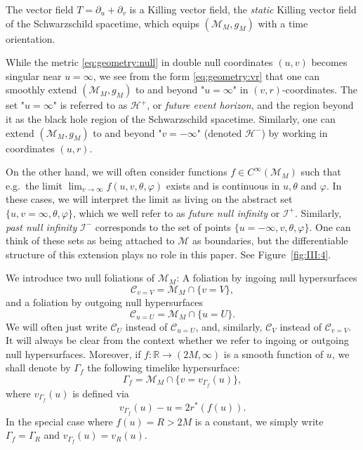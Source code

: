 \documentclass[11pt,english]{article}
\numberwithin{equation}{section}
\theoremstyle{remark}
\theoremstyle{plain}
\theoremstyle{remark}
\newcommand{\pu}{\partial_u}
\newcommand{\pv}{\partial_v}
\renewcommand{\(}{\left(}
\renewcommand{\)}{\right)}
\begin{document}
The vector field $T=\pu+\pv$ is a Killing vector field, the \textit{static} Killing vector field of the Schwarzschild spacetime, which equips $(\mathcal{M}_M,g_M)$ with a time orientation.

While the metric \eqref{eq:geometry:null} in double null coordinates $(u,v)$ becomes singular near $u=\infty$, we see from the form \eqref{eq:geometry:vr} that one can smoothly extend $(\mathcal M_M,g_M)$ to and beyond "$u=\infty$" in $(v,r)$-coordinates. The set "$u=\infty$" is referred to as $\mathcal H^+$, or \textit{future event horizon}, and the region beyond it as the black hole region of the Schwarzschild spacetime. Similarly, one can extend $(\mathcal M_M,g_M)$ to and beyond "$v=-\infty$" (denoted $\mathcal H^-$) by working in coordinates $(u,r)$.

On the other hand, we will often consider functions $f\in C^{\infty}(\mathcal M_M)$ such that  e.g.\ the limit $\lim_{v\to\infty}f(u,v,\theta,\varphi)$ exists and is continuous in $u,\theta$ and $\varphi$.
 In these cases, we will interpret the limit as living on the abstract set $\{u,v=\infty,\theta,\varphi \}$, which we well refer to as \textit{future null infinity} or $\mathcal I^+$.
 Similarly, \textit{past null infinity} $\mathcal I^-$ corresponds to the set of points $\{u=-\infty,v,\theta,\varphi\}$. 
 One can think of these sets as being attached to $\mathcal M$ as boundaries, but the differentiable structure of this extension plays no role in this paper.
 See Figure~\ref{fig:III:4}.
 

We introduce two null foliations of $\mathcal{M}_M$: A foliation by ingoing null hypersurfaces
\begin{equation}
\mathcal{C}_{v=V}=\mathcal{M}_M\cap\{v=V\},
\end{equation}
and a foliation by outgoing null hypersurfaces
\begin{equation}
\mathcal{C}_{u=U}=\mathcal{M}_M\cap\{u=U\}.
\end{equation}
We will often just write $\mathcal C_U$ instead of $\mathcal C_{u=U}$, and, similarly, $\mathcal C_{V}$ instead of $\mathcal C_{v=V}$. It will always be clear from the context whether we refer to ingoing or outgoing null hypersurfaces.
Moreover, if $f:\mathbb{R}\to (2M,\infty)$ is a smooth function of $u$, we shall denote by $\Gamma_f$ the following timelike hypersurface:
\begin{equation}
\Gamma_{f}=\mathcal{M}_M\cap \{v=v_{\Gamma_{f}}(u)\},
\end{equation}
where $v_{\Gamma_{f}}(u)$ is defined via
\[v_{\Gamma_{f}}(u)-u=2r^*(f(u)).\]
In the special case where $f(u)=R>2M$ is a constant, we simply write 
$\Gamma_f=\Gamma_R$
and $v_{\Gamma_{f}}(u)=v_R(u).$
\end{document}
